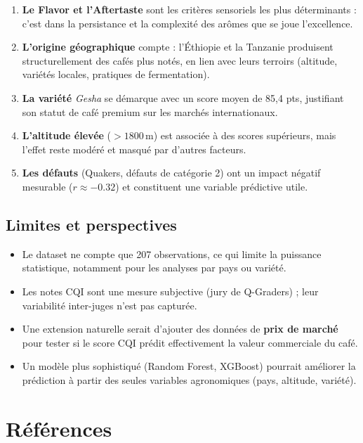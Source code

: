 \documentclass[12pt,a4paper]{article}
\begin{document}
\begin{enumerate}
  \item \textbf{Le Flavor et l'Aftertaste} sont les critères sensoriels les plus déterminants :
        c'est dans la persistance et la complexité des arômes que se joue l'excellence.
  \item \textbf{L'origine géographique} compte : l'Éthiopie et la Tanzanie produisent
        structurellement des cafés plus notés, en lien avec leurs terroirs (altitude, variétés
        locales, pratiques de fermentation).
  \item \textbf{La variété} \textit{Gesha} se démarque avec un score moyen de 85,4 pts,
        justifiant son statut de café premium sur les marchés internationaux.
  \item \textbf{L'altitude élevée} ($> 1800$\,m) est associée à des scores supérieurs,
        mais l'effet reste modéré et masqué par d'autres facteurs.
  \item \textbf{Les défauts} (Quakers, défauts de catégorie 2) ont un impact négatif mesurable
        ($r \approx -0.32$) et constituent une variable prédictive utile.

\end{enumerate}

\subsection{Limites et perspectives}

\begin{itemize}[noitemsep]
  \item Le dataset ne compte que 207 observations, ce qui limite la puissance statistique,
        notamment pour les analyses par pays ou variété.
  \item Les notes CQI sont une mesure subjective (jury de Q-Graders) ; leur variabilité
        inter-juges n'est pas capturée.
  \item Une extension naturelle serait d'ajouter des données de \textbf{prix de marché}
        pour tester si le score CQI prédit effectivement la valeur commerciale du café.
  \item Un modèle plus sophistiqué (Random Forest, XGBoost) pourrait améliorer la prédiction
        à partir des seules variables agronomiques (pays, altitude, variété).
\end{itemize}

\section*{Références}
\end{document}
